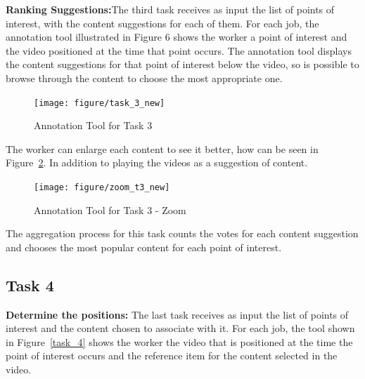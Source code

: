 \textbf{Ranking Suggestions:}The third task receives as input the list of points of interest, with the content suggestions for each of them. For each job, the annotation tool illustrated in Figure 6 shows the worker a point of interest and the video positioned at the time that point occurs. The annotation tool displays the content suggestions for that point of interest below the video, so is possible to browse through the content to choose the most appropriate one.


\begin{figure}[h!]
	\centerline{\texttt{[image: figure/task\_3\_new]}}
	\caption{Annotation Tool for Task 3}
	\label{task_3}
\end{figure}

	
The worker can enlarge each content to see it better, how can be seen in Figure~\ref{zoom_task_3}. In addition to playing the videos as a suggestion of content.
	
		
\begin{figure}[h!]
	\centerline{\texttt{[image: figure/zoom\_t3\_new]}}
	\caption{Annotation Tool for Task 3 - Zoom}
	\label{zoom_task_3}
\end{figure}


The aggregation process for this task counts the votes for each content suggestion and chooses the most popular content for each point of interest.




\subsection{Task 4}

\textbf{Determine the positions:} The last task receives as input the list of points of interest and the content chosen to associate with it. For each job, the tool shown in Figure~\ref{task_4} shows the worker the video that is positioned at the time the point of interest occurs and the reference item for the content selected in the video.

